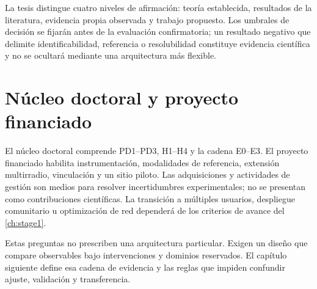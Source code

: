 La tesis distingue cuatro niveles de afirmación: teoría establecida, resultados de la literatura, evidencia propia observada y trabajo propuesto. Los umbrales de decisión se fijarán antes de la evaluación confirmatoria; un resultado negativo que delimite identificabilidad, referencia o resolubilidad constituye evidencia científica y no se ocultará mediante una arquitectura más flexible.

\section{Núcleo doctoral y proyecto financiado}

El núcleo doctoral comprende PD1--PD3, H1--H4 y la cadena E0--E3. El proyecto financiado habilita instrumentación, modalidades de referencia, extensión multirradio, vinculación y un sitio piloto. Las adquisiciones y actividades de gestión son medios para resolver incertidumbres experimentales; no se presentan como contribuciones científicas. La transición a múltiples usuarios, despliegue comunitario u optimización de red dependerá de los criterios de avance del \cref{ch:stage1}.

Estas preguntas no prescriben una arquitectura particular. Exigen un diseño que
compare observables bajo intervenciones y dominios reservados. El capítulo siguiente
define esa cadena de evidencia y las reglas que impiden confundir ajuste, validación
y transferencia.
